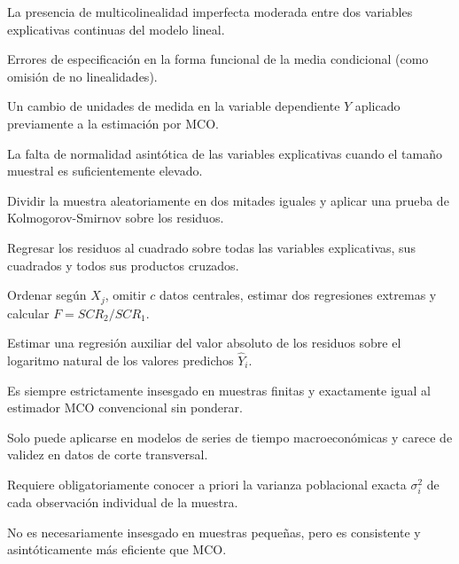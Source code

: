 \begin{opts}
    \item La presencia de multicolinealidad imperfecta moderada entre dos variables explicativas continuas del modelo lineal.
    \item Errores de especificación en la forma funcional de la media condicional (como omisión de no linealidades).
    \item Un cambio de unidades de medida en la variable dependiente $Y$ aplicado previamente a la estimación por MCO.
    \item La falta de normalidad asintótica de las variables explicativas cuando el tamaño muestral es suficientemente elevado.
\end{opts}

\begin{opts}
    \item Dividir la muestra aleatoriamente en dos mitades iguales y aplicar una prueba de Kolmogorov-Smirnov sobre los residuos.
    \item Regresar los residuos al cuadrado sobre todas las variables explicativas, sus cuadrados y todos sus productos cruzados.
    \item Ordenar según $X_j$, omitir $c$ datos centrales, estimar dos regresiones extremas y calcular $F = SCR_2 / SCR_1$.
    \item Estimar una regresión auxiliar del valor absoluto de los residuos sobre el logaritmo natural de los valores predichos $\hat{Y}_i$.
\end{opts}

\begin{opts}
    \item Es siempre estrictamente insesgado en muestras finitas y exactamente igual al estimador MCO convencional sin ponderar.
    \item Solo puede aplicarse en modelos de series de tiempo macroeconómicas y carece de validez en datos de corte transversal.
    \item Requiere obligatoriamente conocer a priori la varianza poblacional exacta $\sigma_i^2$ de cada observación individual de la muestra.
    \item No es necesariamente insesgado en muestras pequeñas, pero es consistente y asintóticamente más eficiente que MCO.
\end{opts}

